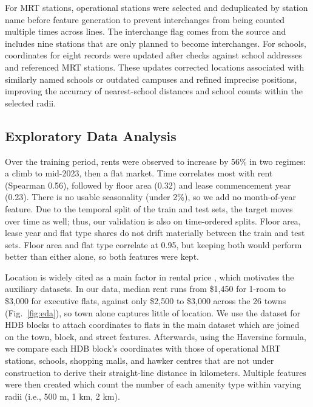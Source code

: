 For MRT stations, operational stations were selected and deduplicated by station name before feature generation to prevent interchanges from being counted multiple times across lines. The interchange flag comes from the source and includes nine stations that are only planned to become interchanges. For schools, coordinates for eight records were updated after checks against school addresses and referenced MRT stations. These updates corrected locations associated with similarly named schools or outdated campuses and refined imprecise positions, improving the accuracy of nearest-school distances and school counts within the selected radii.


\subsection{Exploratory Data Analysis}


Over the training period, rents were observed to increase by 56\% in two regimes: a climb to mid-2023, then a flat market. Time correlates most with rent (Spearman 0.56), followed by floor area (0.32) and lease commencement year (0.23). There is no usable seasonality (under 2\%), so we add no month-of-year feature. Due to the temporal split of the train and test sets, the target moves over time as well; thus, our validation is also on time-ordered splits. Floor area, lease year and flat type shares do not drift materially between the train and test sets. Floor area and flat type correlate at 0.95, but keeping both would perform better than either alone, so both features were kept.

Location is widely cited as a main factor in rental price \cite{Poh:2023:Location}, which motivates the auxiliary datasets. In our data, median rent runs from \$1,450 for 1-room to \$3,000 for executive flats, against only \$2,500 to \$3,000 across the 26 towns (Fig.~\ref{fig:eda}), so town alone captures little of location. We use the dataset for HDB blocks to attach coordinates to flats in the main dataset which are joined on the town, block, and street features. Afterwards, using the Haversine formula, we compare each HDB block’s coordinates with those of operational MRT stations, schools, shopping malls, and hawker centres that are not under construction to derive their straight-line distance in kilometers.  Multiple features were then created which count the number of each amenity type within varying radii (i.e., 500 m, 1 km, 2 km).

